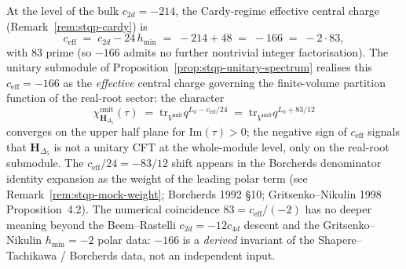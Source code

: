 \begin{remark}[Effective central charge unitarity reading
$c_{\mathrm{eff}} = -166$; \ClaimStatusProvedHere]
\label{rem:stqp-ceff-unitarity}
At the level of the bulk $c_{2d} = -214$, the Cardy-regime
effective central charge (Remark~\ref{rem:stqp-cardy}) is
\[
c_{\mathrm{eff}}
\;=\;
c_{2d} - 24\, h_{\min}
\;=\;
-214 + 48
\;=\;
-166
\;=\;
-2\cdot 83,
\]
with $83$ prime (so $-166$ admits no further nontrivial integer
factorisation). The unitary submodule of
Proposition~\ref{prop:stqp-unitary-spectrum} realises this
$c_{\mathrm{eff}} = -166$ as the \emph{effective} central charge
governing the finite-volume partition function of the real-root
sector: the character
\[
\chi^{\mathrm{unit}}_{\mathbf H_{\Delta_5}}(\tau)
\;=\;
\mathrm{tr}_{V^{\mathrm{unit}}} q^{L_0 - c_{\mathrm{eff}}/24}
\;=\;
\mathrm{tr}_{V^{\mathrm{unit}}} q^{L_0 + 83/12}
\]
converges on the upper half plane for $\mathrm{Im}(\tau) > 0$;
the negative sign of $c_{\mathrm{eff}}$ signals that
$\mathbf H_{\Delta_5}$ is not a unitary CFT at the whole-module
level, only on the real-root submodule. The $c_{\mathrm{eff}}/24
= -83/12$ shift appears in the Borcherds denominator identity
expansion as the weight of the leading polar term (see
Remark~\ref{rem:stqp-mock-weight}; Borcherds 1992
\S 10; Gritsenko--Nikulin 1998 Proposition~4.2). The numerical
coincidence $83 = c_{\mathrm{eff}}/(-2)$ has no deeper meaning
beyond the Beem--Rastelli $c_{2d} = -12 c_{4d}$ descent and the
Gritsenko--Nikulin $h_{\min} = -2$ polar data: $-166$ is a
\emph{derived} invariant of the Shapere--Tachikawa / Borcherds
data, not an independent input.
\end{remark}

